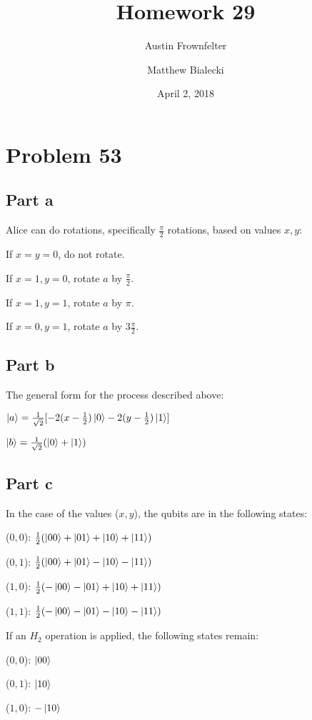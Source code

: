 \documentclass{article}
\title{Homework 29}
\author{Austin Frownfelter \and Matthew Bialecki}
\date{April 2, 2018}
\begin{document}
\maketitle

\section{Problem 53}

\subsection{Part a}
Alice can do rotations, specifically $\frac\pi2$ rotations, based on values $x,y$:

If $x=y=0$, do not rotate.

If $x=1, y=0$, rotate $a$ by $\frac\pi2$.

If $x=1, y=1$, rotate $a$ by $\pi$.

If $x=0, y=1$, rotate $a$ by $3\frac\pi2$.

\subsection{Part b}
The general form for the process described above:

$\ket{a}=\frac1{\sqrt2}[-2(x-\frac12)\ket{0}-2(y-\frac12)\ket{1}]$

$\ket{b}=\frac1{\sqrt2}(\ket0 + \ket1)$

\subsection{Part c}

In the case of the values ($x,y$), the qubits are in the following states:

\smallskip
($0,0$): $\frac12(\ket{00}+\ket{01}+\ket{10}+\ket{11})$

\smallskip
($0,1$): $\frac12(\ket{00}+\ket{01}-\ket{10}-\ket{11})$

\smallskip
($1,0$): $\frac12(-\ket{00}-\ket{01}+\ket{10}+\ket{11})$

\smallskip
($1,1$): $\frac12(-\ket{00}-\ket{01}-\ket{10}-\ket{11})$

\bigskip
\noindent If an $H_2$ operation is applied, the following states remain:

\smallskip
($0,0$): $\ket{00}$

\smallskip
($0,1$): $\ket{10}$

\smallskip
($1,0$): $-\ket{10}$
\end{document}
